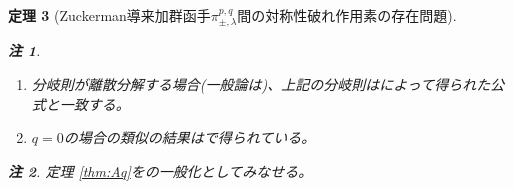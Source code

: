 \documentclass[12pt]{article} %
\newcommand{\Bzeven}{B^{\rm\footnotesize even}}
\newtheorem{theorem}{定理}
\newtheorem{remark}[theorem]{注}
\theoremstyle{definition}
\theoremstyle{exampstyle} \newtheorem{examp}[theorem]{Theorem}
\begin{document}
\begin{theorem}[Zuckerman導来加群函手$\pi_{\pm,\lambda}^{p,q}$間の対称性破れ作用素の存在問題]
\newcommand{\yipxStack}[1][]{\mystack{\yipx}{x\d{\in} \Bzeven(p\d{+}1,q\d{+}1)#1}}
\newcommand{\yimxStack}[1][]{\mystack{\yimx}{x\d{\in} \Bzeven(q\d{+}1,p\d{+}1)#1}}
\newcommand{\yipyStack}[1][]{\mystack{\yipy}{y\d{\in} \Bzeven(p,q\d{+}1)#1}}
\newcommand{\yimyStack}[1][]{\mystack{\yimy}{y\d{\in} \Bzeven(q\d{+}1,p)#1}}

\newcommand{\tzo}{2\Z+1}
\newcommand{\tz}{2\Z}
\newcommand{\tno}{2\N+1}
	
\begin{remark}
	\begin{enumerate}[(1)]
		\item 分岐則が離散分解する場合(一般論は\cite{10.2307/120963})、上記の分岐則は\cite[Thm. 3.3]{kobayashi1993}によって得られた公式と一致する。
		\item $q=0$の場合の類似の結果は\cite[Thm. 1.2]{kobayashi2015symmetry}で得られている。
	\end{enumerate}
\end{remark}
\begin{remark}
定理 \ref{thm:Aq}を\cite[Thms. 12.1 and 1.3]{kobayashi2015symmetry}の一般化としてみなせる。
\end{remark}
\end{theorem}
\nocite{kobayashi2015program}
\nocite{kobayashi1993}
\nocite{10.2307/120963}
\small


\end{document}
